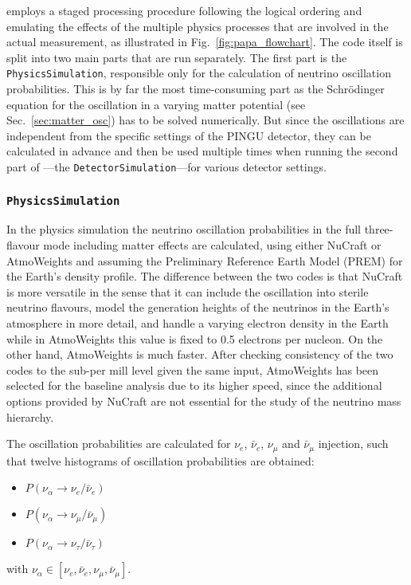 \papa employs a staged processing procedure following the logical ordering and 
emulating the effects of the multiple physics processes that are involved in 
the actual measurement, as illustrated in Fig.~\ref{fig:papa_flowchart}. The 
code itself is split into two main parts that are run separately. The first 
part is the \texttt{PhysicsSimulation}, responsible only for the calculation of 
neutrino oscillation probabilities. This is by far the most time-consuming part 
as the Schr\"odinger equation for the oscillation in a varying matter 
potential (see Sec.~\ref{sec:matter_osc}) has to be solved numerically. But 
since the oscillations are independent from the specific settings of the PINGU 
detector, they can be calculated in advance and then be used multiple times 
when running the second part of \papa---the \texttt{DetectorSimulation}---for 
various detector settings.


\subsubsection{\texttt{PhysicsSimulation}}

In the physics simulation the neutrino oscillation probabilities in
the full three-flavour mode including matter effects are calculated, using
either NuCraft \cite{NuCraft} or AtmoWeights \cite{AtmoWeights} and assuming
the Preliminary Reference Earth Model (PREM) \cite{PREM} for the Earth's density
profile. The difference
between the two codes is that NuCraft is more versatile in the sense that it
can include the oscillation into sterile neutrino flavours, model the
generation heights of the neutrinos in the Earth's atmosphere in more detail,
and handle a varying electron density in the Earth while in AtmoWeights this
value is fixed to 0.5 electrons per nucleon. On the other hand, AtmoWeights is
much faster. After checking consistency of the two codes to the sub-per mill
level given the same input, AtmoWeights has been selected for the baseline
analysis due to its higher speed, since the additional options provided by
NuCraft are not essential for the study of the neutrino mass hierarchy.

The oscillation probabilities are calculated for $\nu_e$, $\bar\nu_e$, $\nu_\mu$
and $\bar\nu_\mu$ injection, such that twelve histograms of oscillation
probabilities are obtained:
\begin{itemize}
 \item $P(\nu_\alpha \to \nu_e/\bar\nu_e)$
 \item $P(\nu_\alpha \to \nu_\mu/\bar\nu_\mu)$
 \item $P(\nu_\alpha \to \nu_\tau/\bar\nu_\tau)$
\end{itemize}
with $\nu_\alpha \in \left[\nu_e,\bar\nu_e,\nu_\mu,\bar\nu_\mu\right]$.

